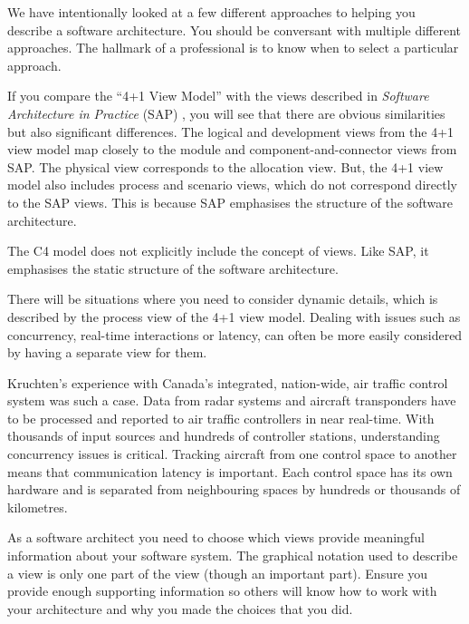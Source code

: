 We have intentionally looked at a few different approaches to helping you describe a software architecture.
You should be conversant with multiple different approaches.
The hallmark of a professional is to know when to select a particular approach.

If you compare the ``4+1 View Model'' \cite{4+1-model} with the views described in \textit{Software Architecture in Practice} (SAP) \cite{bass2021software},
you will see that there are obvious similarities but also significant differences.
The logical and development views from the 4+1 view model map closely to the module and component-and-connector views from SAP.
The physical view corresponds to the allocation view.
But, the 4+1 view model also includes process and scenario views, which do not correspond directly to the SAP views.
This is because SAP emphasises the structure of the software architecture.

The C4 model does not explicitly include the concept of views.
Like SAP, it emphasises the static structure of the software architecture.

There will be situations where you need to consider dynamic details, which is described by the process view of the 4+1 view model.
Dealing with issues such as concurrency, real-time interactions or latency, can often be more easily considered by having a separate view for them.

Kruchten's experience with Canada's integrated, nation-wide, air traffic control system was such a case.
Data from radar systems and aircraft transponders have to be processed and reported to air traffic controllers in near real-time.
With thousands of input sources and hundreds of controller stations, understanding concurrency issues is critical.
Tracking aircraft from one control space to another means that communication latency is important.
Each control space has its own hardware and is separated from neighbouring spaces by hundreds or thousands of kilometres.

As a software architect you need to choose which views provide meaningful information about your software system.
The graphical notation used to describe a view is only one part of the view (though an important part).
Ensure you provide enough supporting information so others will know how to work with your architecture and why you made the choices that you did.